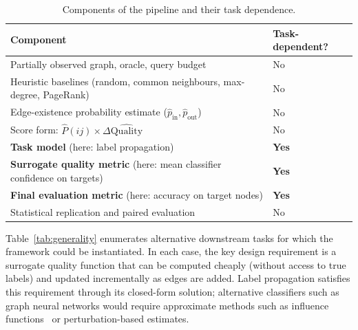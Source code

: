\documentclass[11pt,a4paper]{article}
\begin{document}
\begin{table}[htbp]
\centering
\caption{Components of the pipeline and their task dependence.}
\label{tab:taskdeps}
\small
\begin{tabularx}{\textwidth}{>{\raggedright\arraybackslash}Xl}
\toprule
Component & Task-dependent?\\
\midrule
Partially observed graph, oracle, query budget & No\\
Heuristic baselines (random, common neighbours, max-degree, PageRank) & No\\
Edge-existence probability estimate ($\hat{p}_{\text{in}}, \hat{p}_{\text{out}}$) & No\\
Score form: $\hat{P}(ij) \times \Delta\widehat{\mathrm{Quality}}$ & No\\
\textbf{Task model} (here: label propagation) & \textbf{Yes}\\
\textbf{Surrogate quality metric} (here: mean classifier confidence on targets) & \textbf{Yes}\\
\textbf{Final evaluation metric} (here: accuracy on target nodes) & \textbf{Yes}\\
Statistical replication and paired evaluation & No\\
\bottomrule
\end{tabularx}
\end{table}

Table~\ref{tab:generality} enumerates alternative downstream tasks for which the framework
could be instantiated. In each case, the key design requirement is a surrogate quality function
that can be computed cheaply (without access to true labels) and updated incrementally as edges
are added. Label propagation satisfies this requirement through its closed-form solution;
alternative classifiers such as graph neural networks would require approximate methods such
as influence functions~\cite{koh} or perturbation-based estimates.
\end{document}
